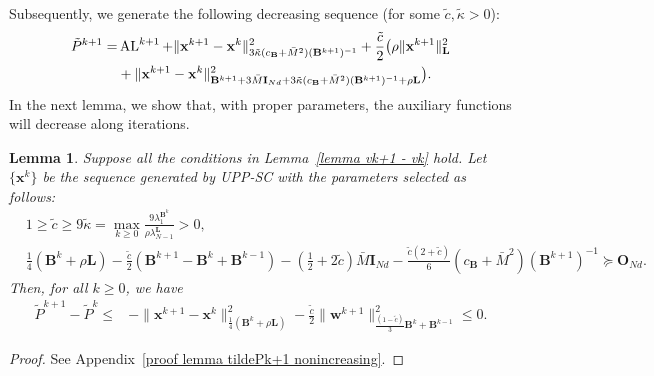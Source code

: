 \documentclass[10pt,a4paper]{amsart}
\newtheorem{lemma}{Lemma}
\begin{document}
 

Subsequently, we generate the following decreasing sequence (for some $\tilde{c},\tilde{\kappa}>0$):
\begin{align}
	\tilde{P}^{k+1}=&\operatorname{AL}^{k+1}+\|\mathbf{x}^{k+1}-\mathbf{x}^k\|^2_{3\tilde{\kappa} (c_{\mathbf{B}}+\bar{M}^2)(\mathbf{B}^{k+1})^{-1}}+\frac{\tilde{c}}{2}\big(\rho\|\mathbf{x}^{k+1}\|^2_\mathbf{L}\notag\\
    &+\|\mathbf{x}^{k+1}-\mathbf{x}^k\|^2_{\mathbf{B}^{k+1}+3\bar{M}\mathbf{I}_{Nd}+3\tilde{\kappa} (c_{\mathbf{B}}+\bar{M}^2)(\mathbf{B}^{k+1})^{-1}+\rho \mathbf{L}}\big). \label{tilde Pk+1}
\end{align}
In the next lemma, we show that, with proper parameters, the auxiliary functions will decrease along iterations. 

\begin{lemma}\label{lemma tildePk+1 nonincreasing}
	Suppose all the conditions in Lemma~\ref{lemma vk+1 - vk} hold.  Let $\{\mathbf{x}^k\}$ be the sequence generated by UPP-SC with the parameters selected as follows:
	\begin{align}
		\label{define tilde c}& 1 \geq \tilde{c}\geq 9\tilde{\kappa}=\max_{k\geq 0}\frac{9\lambda_1^{\mathbf{B}^k}}{\rho \lambda_{N-1}^{\mathbf{L}}}>0, \\
		\label{Bk+rhoL-c/2Bk-1}& \frac{1}{4}(\mathbf{B}^k+\rho \mathbf{L})-\frac{\tilde{c}}{2}(\mathbf{B}^{k+1}-\mathbf{B}^k+\mathbf{B}^{k-1})\!-\!(\frac{1}{2}+2\tilde{c})\bar{M}\mathbf{I}_{Nd}-\frac{\tilde{c}(2+\tilde{c})}{6}(c_{\mathbf{B}}+\bar{M}^2)(\mathbf{B}^{k+1})^{-1} \succeq \mathbf{O}_{Nd}.
	\end{align}
	Then, for all $k\geq 0$, we have
	\begin{align}
		\tilde{P}^{k+1}-\tilde{P}^{k}\leq& -\|\mathbf{x}^{k+1}-\mathbf{x}^k\|^2_{\frac{1}{4}(\mathbf{B}^k+\rho \mathbf{L})}-\frac{\tilde{c}}{2} \|\mathbf{w}^{k+1}\|^2_{\frac{(1-\tilde{c})}{3}\mathbf{B}^k+\mathbf{B}^{k-1}}\leq 0.  \label{tildePk+1 - tildePk lemma}
	\end{align}
\end{lemma}

\begin{proof}
	See Appendix~\ref{proof lemma tildePk+1 nonincreasing}.
\end{proof}
\end{document}
